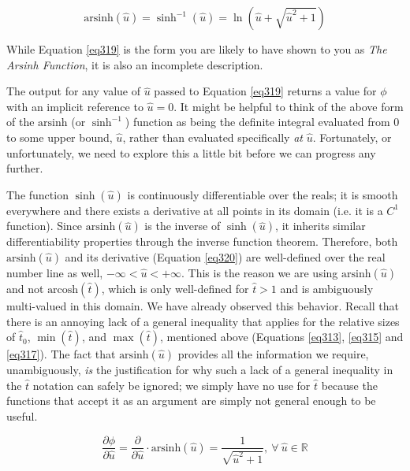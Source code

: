 \documentclass{article}
\begin{document}
\begin{equation} \label{eq319}
\text{arsinh}\left( \hat{u} \right) = \sinh^{- 1}\left( \hat{u} \right) = \ln\left( \hat{u} + \sqrt{{\hat{u}}^{2} + 1} \right)
\end{equation}

While Equation \ref{eq319} is the form you are likely to have shown to you as \textit{The Arsinh Function}, it is also an incomplete description. 

The output for any value of $\hat{u}$ passed to Equation \ref{eq319} returns a value for $\phi$ with an implicit reference to $\hat{u} = 0$. It might be helpful to think of the above form of the $\text{arsinh}$ (or $\sinh^{-1}$) function as being the definite integral evaluated from $0$ to some upper bound, $\hat{u}$, rather than evaluated specifically \textit{at} $\hat{u}$. Fortunately, or unfortunately, we need to explore this a little bit before we can progress any further. 

The function $\sinh{\left( \hat{u} \right)}$ is continuously differentiable over the reals; it is smooth everywhere and there exists a derivative at all points in its domain (i.e. it is a $C^{1}$ function). Since $\text{arsinh} \left( \hat{u} \right)$ is the inverse of $\sinh{\left( \hat{u} \right)}$, it inherits similar differentiability properties through the inverse function theorem. Therefore, both $\text{arsinh} \left( \hat{u} \right)$ and its derivative (Equation \ref{eq320}) are well-defined over the real number line as well, $- \infty < \hat{u} < + \infty$. This is the reason we are using $\text{arsinh} \left( \hat{u} \right)$ and not $\text{arcosh} \left( \hat{t} \right)$, which is only well-defined for $\hat{t} > 1$ and is ambiguously multi-valued in this domain. We have already observed this behavior. Recall that there is an annoying lack of a general inequality that applies for the relative sizes of ${\hat{t}_{0}}$, $\min \left( \hat{t} \right)$, and $\max \left( \hat{t} \right)$, mentioned above (Equations \ref{eq313}, \ref{eq315} and \ref{eq317}). The fact that $\text{arsinh} \left( \hat{u} \right)$ provides all the information we require, unambiguously, \textit{is} the justification for why such a lack of a general inequality in the $\hat{t}$ notation can safely be ignored; we simply have no use for $\hat{t}$ because the functions that accept it as an argument are simply not general enough to be useful.

\begin{equation} \label{eq320}
\displaystyle \frac{\partial\phi}{\partial\hat{u}} = \displaystyle \frac{\partial}{\partial\hat{u}} \cdot \text{arsinh}\left( \hat{u} \right) = \displaystyle \frac{1}{\sqrt{{\hat{u}}^{2} + 1}},\ \forall\ \hat{u}\mathbb{\in R}
\end{equation}
\end{document}
